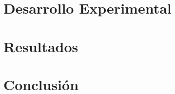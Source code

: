 \documentclass[conference]{IEEEtran}
\begin{document}
\section{Desarrollo Experimental}



\section{Resultados}


\section{Conclusión}


\printbibliography
\end{document}
